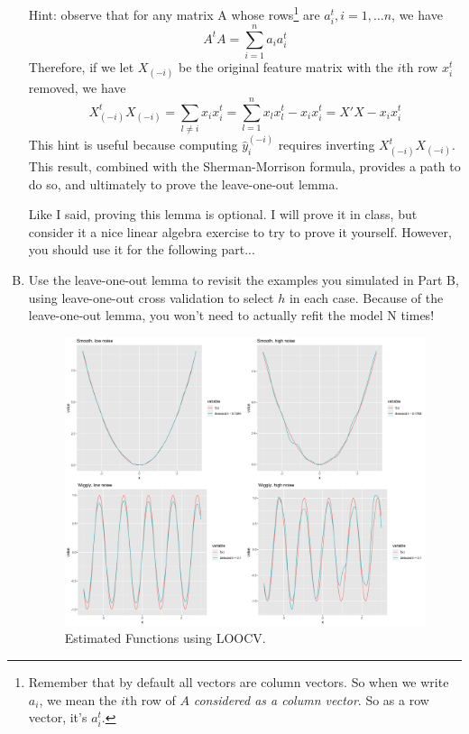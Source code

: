 \documentclass[11pt]{article}
\begin{document}
\begin{enumerate}[(A)]
Hint: observe that for any matrix A whose rows\footnote{Remember that by default all vectors are column vectors. So when we write $a_i$, we mean the $i$th row of $A$ \emph{considered as a column vector}.  So as a row vector, it's $a_i^t$.} are $a_i^t, i = 1, \ldots n$, we have
$$
A^t A = \sum_{i=1}^n a_i a_i^t
$$
Therefore, if we let $X_{(-i)}$ be the original feature matrix with the $i$th row $x_i^t$ removed, we have
$$
X_{(-i)}^t X_{(-i)} = \sum_{l \neq i} x_i x_i^t = \sum_{l=1}^n x_l x_l^t  - x_i x_i^t = X'X - x_i x_i^t
$$
 This hint is useful because computing $\hat{y}_{i}^{(-i)}$ requires inverting $X_{(-i)}^t X_{(-i)}$.  This result, combined with the Sherman-Morrison formula, provides a path to do so, and ultimately to prove the leave-one-out lemma.  

Like I said, proving this lemma is optional. I will prove it in class, but consider it a nice linear algebra exercise to try to prove it yourself.  However, you should use it for the following part...

\item Use the leave-one-out lemma to revisit the examples you simulated in Part B, using leave-one-out cross validation to select $h$ in each case.  Because of the leave-one-out lemma, you won't need to actually refit the model N times!  

\begin{figure}[h]
    \centering
    \includegraphics[width=\textwidth]{Ex6/figures/crossva_LOO.png}
    \caption{Estimated Functions using LOOCV.}
\end{figure}

\end{enumerate}
\end{document}
